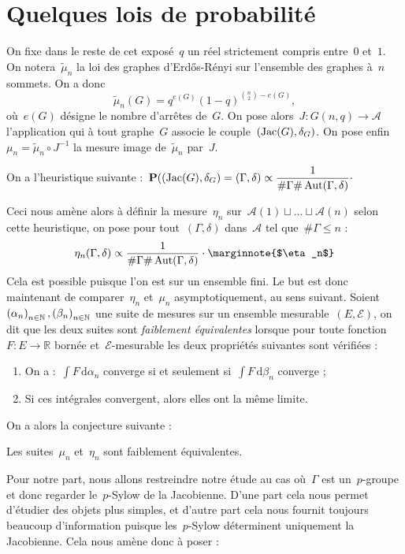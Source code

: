 \section{Quelques lois de probabilité}
	On fixe dans le reste de cet exposé~$q$ un réel strictement compris entre~$0$ et~$1$. On notera~$\tilde{\mu}_n$ la loi des graphes d'Erd\H{o}s-Rényi sur l'ensemble des graphes à~$n$ sommets. On a donc
	\[
		\tilde{\mu}_n(G) = q^{e(G)}(1-q)^{\binom{n}{2}-e(G)},
	\]
	où~$e(G)$ désigne le nombre d'arrêtes de~$G$. On pose alors~$J:G(n,q)\rightarrow \mathscr{A}$ l'application qui à tout graphe~$G$ associe le couple~$(\operatorname{Jac}(G),\delta_G)$. On pose enfin~$\mu_n = \tilde{\mu}_n \circ J^{-1}$ la mesure image de~$\tilde{\mu}_n$ par~$J$.
	\begin{heur}
		On a l'heuristique suivante :~$\displaystyle\bm{\mathrm{P}}((\operatorname{Jac}(G),\delta_G)=(\Gamma,\delta) \propto \frac{1}{\#\Gamma\#\operatorname{Aut}(\Gamma,\delta)}\cdot$
	\end{heur}
	Ceci nous amène alors à définir la mesure~$\eta_n$ sur~$\mathscr{A}(1)\sqcup ...\sqcup \mathscr{A}(n)$ selon cette heuristique, on pose pour tout~$(\Gamma,\delta)$ dans~$\mathscr{A}$ tel que~$\#\Gamma \leq n$ :
	\[
		\eta_n(\Gamma,\delta) \propto\frac{1}{\#\Gamma\#\Aut(\Gamma,\delta)}\cdot
		\text{\marginnote{$\eta_n$}}
	\]
	Cela est possible puisque l'on est sur un ensemble fini. Le but est donc maintenant de comparer~$\eta_n$ et~$\mu_n$ asymptotiquement, au sens suivant. Soient~$\suite{\alpha},\suite{\beta}$ une suite de mesures sur un ensemble mesurable~$(E,\mathcal{E})$, on dit que les deux suites sont \emph{faiblement équivalentes} lorsque pour toute fonction~$F : E\rightarrow\mathbb{R}$ bornée et~$\mathcal{E}$-mesurable les deux propriétés suivantes sont vérifiées :
	\begin{enumerate}
		\item On a :~$\int F\,\mathrm{d}\alpha_n$ converge si et seulement si~$\int F\,\mathrm{d}\beta_n$ converge ;
		\item Si ces intégrales convergent, alors elles ont la même limite.
	\end{enumerate}
	 On a alors la conjecture suivante :
	\begin{conj}
		Les suites~$\mu_n$ et~$\eta_n$ sont faiblement équivalentes.
	\end{conj}
	Pour notre part, nous allons restreindre notre étude au cas où~$\Gamma$ est un~$p$-groupe et donc regarder le~$p$-Sylow de la Jacobienne. D'une part cela nous permet d'étudier des objets plus simples, et d'autre part cela nous fournit toujours beaucoup d'information puisque les~$p$-Sylow déterminent uniquement la Jacobienne. Cela nous amène donc à poser :
